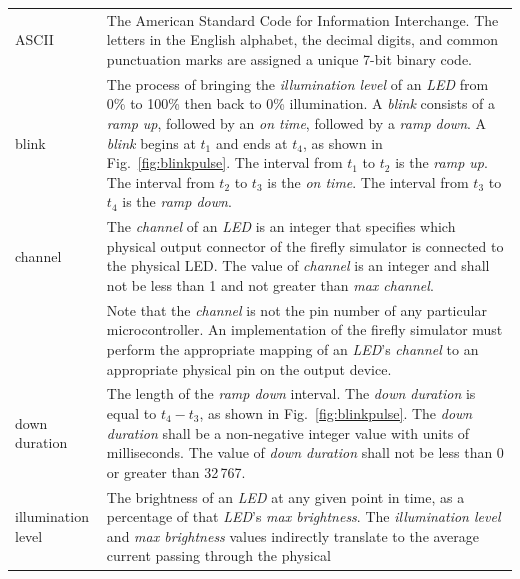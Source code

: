 \documentclass[letterpaper,11pt]{article}
\begin{document}
\setlength\extrarowheight{4pt}
\begin{supertabular}{p{1.5in}p{5in}}
ASCII &
    The American Standard Code for Information Interchange. The letters in
    the English alphabet, the decimal digits, and common punctuation marks are
    assigned a unique 7-bit binary code.\\
blink &
    The process of bringing the \textit{illumination level} of an \textit{LED}
    from 0\% to 100\% then back to 0\% illumination. A \textit{blink} consists of
    a \textit{ramp up}, followed by an \textit{on time}, followed by a
    \textit{ramp down}. A \textit{blink} begins at $t_1$ and ends at $t_4$,
    as shown in Fig.\ \ref{fig:blinkpulse}. The interval from $t_1$ to $t_2$
    is the \textit{ramp up}. The interval from $t_2$ to $t_3$ is the \textit{on
    time}.  The interval from $t_3$ to $t_4$ is the \textit{ramp down}. \\
channel &
    The \textit{channel} of an \textit{LED} is an integer that specifies
    which physical output connector of the firefly simulator is connected
    to the physical LED. The value of \textit{channel} is an integer and
    shall not be less than 1 and not greater than \textit{max channel}.\\
        &
    Note that the \textit{channel} is not the pin number of any particular
    microcontroller. An implementation of the firefly simulator must perform
    the appropriate mapping of an \textit{LED}'s \textit{channel} to an
    appropriate physical pin on the output device.\\
down duration & 
    The length of the \textit{ramp down} interval. The \textit{down duration}
    is equal to $t_4 - t_3$, as shown in Fig.\ \ref{fig:blinkpulse}. The
    \textit{down duration} shall be a non-negative integer value with units
    of milliseconds. The value of \textit{down duration} shall not be less
    than 0 or greater than 32\,767.\\
%
illumination level &
    The brightness of an \textit{LED} at any given point in time, as a
    percentage of that \textit{LED}'s \textit{max brightness}. The
    \textit{illumination level} and \textit{max brightness} values
    indirectly translate to the average current passing through the physical

\end{supertabular}
\end{document}
